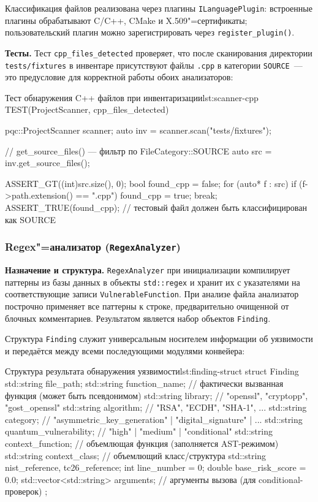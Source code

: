 Классификация файлов реализована через плагины
\texttt{ILanguagePlugin}: встроенные плагины обрабатывают C/C++,
CMake и X.509"=сертификаты; пользовательский плагин можно
зарегистрировать через \texttt{register\_plugin()}.

\textbf{Тесты.}
Тест \texttt{cpp\_files\_detected} проверяет, что после сканирования
директории \texttt{tests/\allowbreak fixtures} в инвентаре присутствуют
файлы \texttt{.cpp} в категории \texttt{SOURCE}~--- это предусловие
для корректной работы обоих анализаторов:

\begin{itmolisting}[C++]{Тест обнаружения C++ файлов при инвентаризации}{lst:scanner-cpp}
TEST(ProjectScanner, cpp_files_detected) {
    pqc::ProjectScanner scanner;
    auto inv = scanner.scan("tests/fixtures");

    // get_source_files() — фильтр по FileCategory::SOURCE
    auto src = inv.get_source_files();

    ASSERT_GT((int)src.size(), 0);
    bool found_cpp = false;
    for (auto* f : src)
        if (f->path.extension() == ".cpp") { found_cpp = true; break; }
    ASSERT_TRUE(found_cpp); // тестовый файл должен быть классифицирован как SOURCE
}
\end{itmolisting}

\subsubsection{Regex"=анализатор (\texttt{RegexAnalyzer})}

\textbf{Назначение и структура.}
\texttt{RegexAnalyzer} при инициализации компилирует паттерны из базы
данных в объекты \texttt{std::regex} и хранит их с указателями на
соответствующие записи \texttt{VulnerableFunction}.
При анализе файла анализатор построчно применяет все паттерны
к строке, предварительно очищенной от блочных комментариев.
Результатом является набор объектов \texttt{Finding}.

Структура \texttt{Finding} служит универсальным носителем
информации об уязвимости и передаётся между всеми последующими
модулями конвейера:

\begin{itmolisting}[C++]{Структура результата обнаружения уязвимости}{lst:finding-struct}
struct Finding {
    std::string file_path;
    std::string function_name;   // фактически вызванная функция (может быть псевдонимом)
    std::string library;         // "openssl", "cryptopp", "gost_openssl"
    std::string algorithm;       // "RSA", "ECDH", "SHA-1", ...
    std::string category;        // "asymmetric_key_generation" | "digital_signature" | ...
    std::string quantum_vulnerability; // "high" | "medium" | "conditional"
    std::string context_function;  // объемлющая функция (заполняется AST-режимом)
    std::string context_class;     // объемлющий класс/структура
    std::string nist_reference, tc26_reference;
    int line_number = 0;
    double base_risk_score = 0.0;
    std::vector<std::string> arguments; // аргументы вызова (для conditional-проверок)
};
\end{itmolisting}

